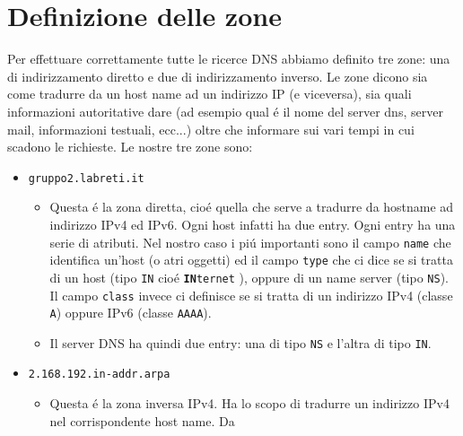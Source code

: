 \documentclass[9pt, a4paper, oneside]{article}
\begin{document}
		\section{Definizione delle zone}
			\par
				Per effettuare correttamente tutte le ricerce 
				DNS abbiamo definito tre zone: una di 
				indirizzamento diretto e due di indirizzamento 
				inverso. Le zone dicono sia come tradurre da 
				un host name ad un indirizzo IP (e viceversa), 
				sia quali informazioni autoritative dare (ad 
				esempio qual \'e il nome del server dns, 
				server mail, informazioni testuali, ecc...) 
				oltre che informare sui vari tempi in cui 
				scadono le richieste. Le nostre tre zone sono:
				\begin{itemize}
					\item
						\texttt{gruppo2.labreti.it}
						\begin{itemize}
							\item
								Questa \'e la 
								zona diretta, 
								cio\'e quella 
								che serve a 
								tradurre da 
								hostname ad 
								indirizzo IPv4 
								ed IPv6. Ogni 
								host infatti 
								ha due entry.
								Ogni entry ha 
								una serie di 
								atributi. Nel 
								nostro caso i 
								pi\'u 
								importanti sono 
								il campo 
								\texttt{name} 
								che identifica 
								un'host (o 
								atri oggetti) 
								ed il campo
								\texttt{type} 
								che ci dice se 
								si tratta di un 
								host (tipo 
								\texttt{IN} 
								cio\'e 
								\texttt{\textbf{IN}ternet}
								), oppure di un 
								name server 
								(tipo 
								\texttt{NS}).
								Il campo 
								\texttt{class}
								invece ci 
								definisce se 
								si tratta di un 
								indirizzo IPv4 
								(classe 
								\texttt{A}) 
								oppure IPv6 
								(classe 
								\texttt{AAAA}).
							\item
								Il server DNS 
								ha quindi due 
								entry: una di 
								tipo 
								\texttt{NS} 
								e l'altra di 
								tipo 
								\texttt{IN}. 
						\end{itemize}
					\item
						\texttt{2.168.192.in-addr.arpa}
						\begin{itemize}
							\item
								Questa \'e la 
								zona inversa 
								IPv4. Ha lo 
								scopo di 
								tradurre un 
								indirizzo IPv4 
								nel 
								corrispondente 
								host name. Da 

\end{itemize}
\end{itemize}
\end{document}
